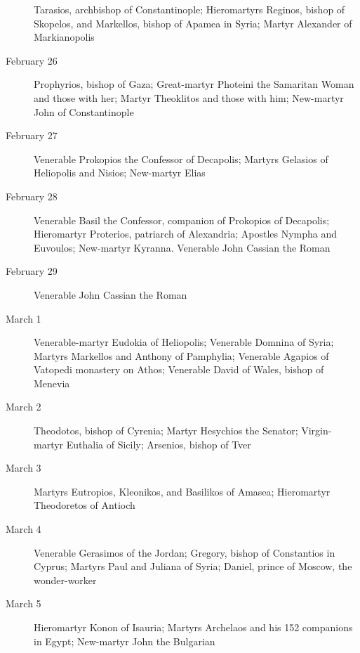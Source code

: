 \begin{description}
Tarasios, archbishop of Constantinople; Hieromartyrs Reginos, bishop of Skopelos, and Markellos, bishop of Apamea in Syria; Martyr Alexander of Markianopolis

\item[February 26]

Prophyrios, bishop of Gaza; Great-martyr Photeini the Samaritan Woman and those with her; Martyr Theoklitos and those with him; New-martyr John of Constantinople

\item[February 27]

Venerable Prokopios the Confessor of Decapolis; Martyrs Gelasios of Heliopolis and Nisios; New-martyr Elias

\item[February 28]

Venerable Basil the Confessor, companion of Prokopios of Decapolis; Hieromartyr Proterios, patriarch of Alexandria; Apostles Nympha and Euvoulos; New-martyr Kyranna. Venerable John Cassian the Roman

\item[February 29]

Venerable John Cassian the Roman

\item[March 1]

Venerable-martyr Eudokia of Heliopolis; Venerable Domnina of Syria; Martyrs Markellos and Anthony of Pamphylia; Venerable Agapios of Vatopedi monastery on Athos; Venerable David of Wales, bishop of Menevia

\item[March 2]

Theodotos, bishop of Cyrenia; Martyr Hesychios the Senator; Virgin-martyr Euthalia of Sicily; Arsenios, bishop of Tver

\item[March 3]

Martyrs Eutropios, Kleonikos, and Basilikos of Amasea; Hieromartyr Theodoretos of Antioch

\item[March 4]

Venerable Gerasimos of the Jordan; Gregory, bishop of Constantios in Cyprus; Martyrs Paul and Juliana of Syria; Daniel, prince of Moscow, the wonder-worker

\item[March 5]

Hieromartyr Konon of Isauria; Martyrs Archelaos and his 152 companions in Egypt; New-martyr John the Bulgarian


\end{description}
